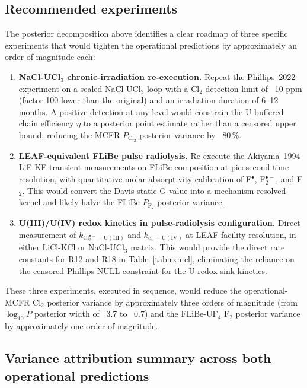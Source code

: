 \documentclass[11pt]{article}
\theoremstyle{plain}
\theoremstyle{definition}
\theoremstyle{remark}
\newcommand{\eS}{\ensuremath{e_{\mathrm{s}}^{-}}\xspace}
\newcommand{\Clt}{\ensuremath{\mathrm{Cl}_2^{\bullet-}}\xspace}
\begin{document}
\subsection{Recommended experiments}\label{sec:op:recs}

The posterior decomposition above identifies a clear roadmap of three
specific experiments that would tighten the operational predictions by
approximately an order of magnitude each:

\begin{enumerate}
\item \textbf{NaCl-UCl$_3$ chronic-irradiation re-execution.}
      Repeat the Phillips~2022 experiment on a sealed NaCl-UCl$_3$ loop
      with a Cl$_2$ detection limit of ~10 ppm (factor 100 lower than the
      original) and an irradiation duration of 6--12 months.  A positive
      detection at any level would constrain the U-buffered chain
      efficiency $\eta$ to a posterior point estimate rather than a censored
      upper bound, reducing the MCFR $P_{\mathrm{Cl_2}}$ posterior variance
      by ~80\,\%.
\item \textbf{LEAF-equivalent FLiBe pulse radiolysis.}
      Re-execute the Akiyama~1994 LiF-KF transient measurements on FLiBe
      composition at picosecond time resolution, with quantitative
      molar-absorptivity calibration of F$^{\bullet}$, F$_2^{\bullet-}$,
      and F$_2$.  This would convert the Davis static G-value into a
      mechanism-resolved kernel and likely halve the FLiBe $P_{\mathrm{F_2}}$
      posterior variance.
\item \textbf{U(III)/U(IV) redox kinetics in pulse-radiolysis configuration.}
      Direct measurement of $k_{\Clt+\mathrm{U(III)}}$ and
      $k_{\eS+\mathrm{U(IV)}}$ at LEAF facility resolution, in either
      LiCl-KCl or NaCl-UCl$_3$ matrix.  This would provide the direct rate
      constants for R12 and R18 in Table~\ref{tab:rxn-cl}, eliminating the
      reliance on the censored Phillips NULL constraint for the U-redox
      sink kinetics.
\end{enumerate}

These three experiments, executed in sequence, would reduce the
operational-MCFR Cl$_2$ posterior variance by approximately three orders
of magnitude (from $\log_{10}\!P$ posterior width of ~3.7 to ~0.7) and the
FLiBe-UF$_4$ F$_2$ posterior variance by approximately one order of
magnitude.

\subsection{Variance attribution summary across both
operational predictions}\label{sec:op:variance}
\end{document}
